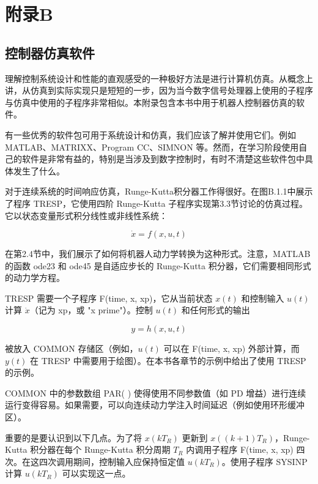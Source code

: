 \documentclass[UTF8]{ctexart}
\begin{document}
\section*{附录B}

\subsection*{控制器仿真软件}

理解控制系统设计和性能的直观感受的一种极好方法是进行计算机仿真。从概念上讲，从仿真到实际实现只是短短的一步，因为当今数字信号处理器上使用的子程序与仿真中使用的子程序非常相似。本附录包含本书中用于机器人控制器仿真的软件。

有一些优秀的软件包可用于系统设计和仿真，我们应该了解并使用它们。例如 MATLAB、MATRIXX、Program CC、SIMNON 等。然而，在学习阶段使用自己的软件是非常有益的，特别是当涉及到数字控制时，有时不清楚这些软件包中具体发生了什么。

对于连续系统的时间响应仿真，Runge-Kutta积分器工作得很好。在图B.1.1中展示了程序 TRESP，它使用四阶 Runge-Kutta 子程序实现第3.3节讨论的仿真过程。它以状态变量形式积分线性或非线性系统：

\begin{equation}
\dot{x} = f(x, u, t)
\end{equation}

在第2.4节中，我们展示了如何将机器人动力学转换为这种形式。注意，MATLAB 的函数 ode23 和 ode45 是自适应步长的 Runge-Kutta 积分器，它们需要相同形式的动力学方程。

TRESP 需要一个子程序 F(time, x, xp)，它从当前状态 $x(t)$ 和控制输入 $u(t)$ 计算 $\dot{x}$（记为 xp，或 "x prime"）。控制 $u(t)$ 和任何形式的输出

\begin{equation}
y = h(x, u, t)
\end{equation}

被放入 COMMON 存储区（例如，$u(t)$ 可以在 F(time, x, xp) 外部计算，而 $y(t)$ 在 TRESP 中需要用于绘图）。在本书各章节的示例中给出了使用 TRESP 的示例。

COMMON 中的参数数组 PAR( ) 使得使用不同参数值（如 PD 增益）进行连续运行变得容易。如果需要，可以向连续动力学注入时间延迟（例如使用环形缓冲区）。

重要的是要认识到以下几点。为了将 $x(kT_R)$ 更新到 $x((k+1)T_R)$，Runge-Kutta 积分器在每个 Runge-Kutta 积分周期 $T_R$ 内调用子程序 F(time, x, xp) 四次。在这四次调用期间，控制输入应保持恒定值 $u(kT_R)$。使用子程序 SYSINP 计算 $u(kT_R)$ 可以实现这一点。
\end{document}
